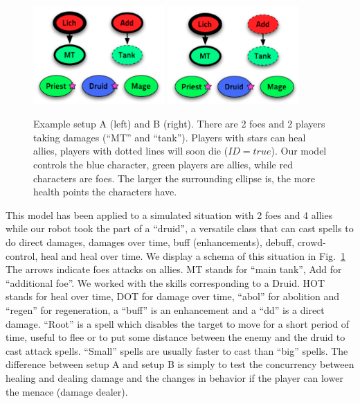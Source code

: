 \begin{figure}[h!]
\begin{center}
\includegraphics[width=5cm]{images/wow_fight1.png} \hspace{1.5cm} \includegraphics[width=5cm]{images/wow_fight2.png}
\caption{Example setup A (left) and B (right). There are 2 foes and 2 players taking damages (``MT'' and ``tank''). Players with stars can heal allies, players with dotted lines will soon die ($ID=true$). Our model controls the blue character, green players are allies, while red characters are foes. The larger the surrounding ellipse is, the more health points the characters have.}
\label{fig:wow_fight}
\end{center}
\end{figure}

This model has been applied to a simulated situation with 2 foes and 4 allies while our robot took the part of a ``druid'', a versatile class that can cast spells to do direct damages, damages over time, buff (enhancements), debuff, crowd-control, heal and heal over time. We display a schema of this situation in Fig.~\ref{fig:wow_fight} The arrows indicate foes attacks on allies. MT stands for ``main tank'', Add for ``additional foe''. We worked with the skills corresponding to a Druid. HOT stands for heal over time, DOT for damage over time, ``abol'' for abolition and ``regen'' for regeneration, a ``buff'' is an enhancement and a ``dd'' is a direct damage. ``Root'' is a spell which disables the target to move for a short period of time, useful to flee or to put some distance between the enemy and the druid to cast attack spells. ``Small'' spells are usually faster to cast than ``big'' spells. The difference between setup A and setup B is simply to test the concurrency between healing and dealing damage and the changes in behavior if the player can lower the menace (damage dealer).

